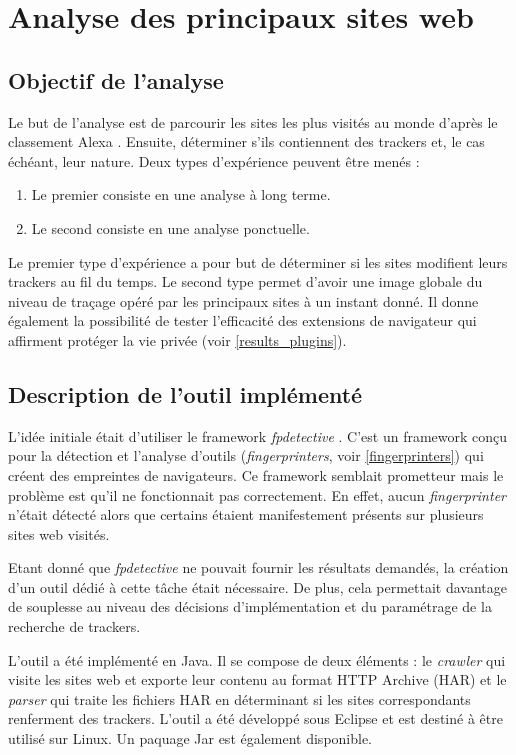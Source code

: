 \chapter{Analyse des principaux sites web}
\section{Objectif de l'analyse}
Le but de l'analyse est de parcourir les sites les plus visités au monde d'après le classement Alexa \cite{AlexaTop}. Ensuite, déterminer s'ils contiennent des trackers et, le cas échéant, leur nature. Deux types d'expérience peuvent être menés :
\begin{enumerate}
	\item Le premier consiste en une analyse à long terme.
	\item Le second consiste en une analyse ponctuelle.
\end{enumerate}

Le premier type d'expérience a pour but de déterminer si les sites modifient leurs trackers au fil du temps.
Le second type permet d'avoir une image globale du niveau de traçage opéré par les principaux sites à un instant donné. Il donne également la possibilité de tester l'efficacité des extensions de navigateur qui affirment protéger la vie privée (voir \autoref{results_plugins}).

\section{Description de l'outil implémenté}
L'idée initiale était d'utiliser le framework \textit{fpdetective} \cite{Acar:2013:FDW:2508859.2516674}. C'est un framework conçu pour la détection et l'analyse d'outils (\textit{fingerprinters}, voir \autoref{fingerprinters}) qui créent des empreintes de navigateurs. Ce framework semblait prometteur mais le problème est qu'il ne fonctionnait pas correctement. En effet, aucun \textit{fingerprinter} n'était détecté alors que certains étaient manifestement présents sur plusieurs sites web visités.

Etant donné que \textit{fpdetective} ne pouvait fournir les résultats demandés, la création d'un outil dédié à cette tâche était nécessaire. De plus, cela permettait davantage de souplesse au niveau des décisions d'implémentation et du paramétrage de la recherche de trackers.
\newline

L'outil a été implémenté en Java. Il se compose de deux éléments : le \textit{crawler} qui visite les sites web et exporte leur contenu au format HTTP Archive (HAR) et le \textit{parser} qui traite les fichiers HAR en déterminant si les sites correspondants renferment des trackers.
L'outil a été développé sous Eclipse et est destiné à être utilisé sur Linux. Un paquage Jar est également disponible.
\newline

